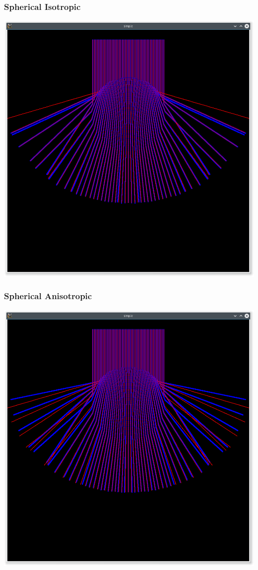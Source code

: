\documentclass{beamer}
\begin{document}
\begin{frame}
\frametitle{Spherical Isotropic}

\includegraphics[width=\textwidth]{spherical_isotropic.png}

\end{frame}

\begin{frame}
\frametitle{Spherical Anisotropic}

\includegraphics[width=\textwidth]{spherical_anisotropic.png}

\end{frame}
\end{document}
